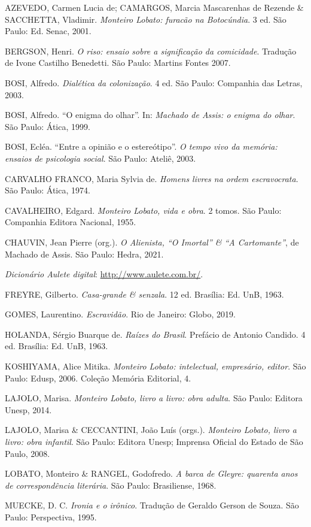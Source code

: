 \documentclass[12pt]{extarticle}
\begin{document}
AZEVEDO, Carmen Lucia de; CAMARGOS, Marcia Mascarenhas de Rezende \&
SACCHETTA, Vladimir. \emph{Monteiro Lobato: furacão na Botocúndia}. 3
ed. São Paulo: Ed. Senac, 2001.

BERGSON, Henri. \emph{O riso: ensaio sobre a significação da
comicidade}. Tradução de Ivone Castilho Benedetti. São Paulo: Martins
Fontes 2007.

BOSI, Alfredo. \emph{Dialética da colonização}. 4 ed. São Paulo:
Companhia das Letras, 2003.

BOSI, Alfredo. ``O enigma do olhar''. In: \emph{Machado de Assis: o
enigma do olhar}. São Paulo: Ática, 1999.

BOSI, Ecléa. ``Entre a opinião e o estereótipo''. \emph{O tempo vivo da
memória: ensaios de psicologia social}. São Paulo: Ateliê, 2003.

CARVALHO FRANCO, Maria Sylvia de. \emph{Homens livres na ordem
escravocrata}. São Paulo: Ática, 1974.

CAVALHEIRO, Edgard. \emph{Monteiro Lobato, vida e obra}. 2 tomos. São
Paulo: Companhia Editora Nacional, 1955.

CHAUVIN, Jean Pierre (org.). \emph{O Alienista, ``O Imortal'' \& ``A
Cartomante''}, de Machado de Assis. São Paulo: Hedra, 2021.

\emph{Dicionário Aulete digital}: \url{http://www.aulete.com.br/}.

FREYRE, Gilberto. \emph{Casa-grande \& senzala}. 12 ed. Brasília: Ed.
UnB, 1963.

GOMES, Laurentino. \emph{Escravidão}. Rio de Janeiro: Globo, 2019.

HOLANDA, Sérgio Buarque de. \emph{Raízes do Brasil}. Prefácio de Antonio
Candido. 4 ed. Brasília: Ed. UnB, 1963.

KOSHIYAMA, Alice Mitika. \emph{Monteiro Lobato: intelectual, empresário,
editor}. São Paulo: Edusp, 2006. Coleção Memória Editorial, 4.

LAJOLO, Marisa. \emph{Monteiro Lobato, livro a livro: obra adulta}. São
Paulo: Editora Unesp, 2014.

LAJOLO, Marisa \& CECCANTINI, João Luís (orgs.). \emph{Monteiro Lobato,
livro a livro: obra infantil}. São Paulo: Editora Unesp; Imprensa
Oficial do Estado de São Paulo, 2008.

LOBATO, Monteiro \& RANGEL, Godofredo. \emph{A barca de Gleyre: quarenta
anos de correspondência literária}. São Paulo: Brasiliense, 1968.

MUECKE, D. C. \emph{Ironia e o irônico}. Tradução de Geraldo Gerson de
Souza. São Paulo: Perspectiva, 1995.
\end{document}
